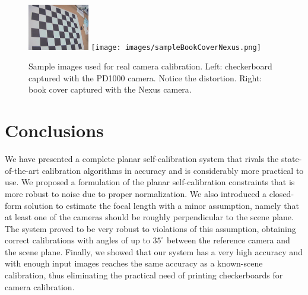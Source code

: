 \documentclass[10pt,twocolumn,letterpaper]{article}
\begin{document}
\begin{figure}
\centering
\includegraphics[height=2cm]{images/sampleOldCam.jpg}
\texttt{[image: images/sampleBookCoverNexus.png]}
\caption{Sample images used for real camera calibration. Left: checkerboard captured with the PD1000 camera. Notice the distortion. Right: book cover captured with the Nexus camera.}
\end{figure}  

\section{Conclusions}

We have presented a complete planar self-calibration system that rivals the state-of-the-art calibration algorithms in accuracy and is considerably more practical to use. We proposed a formulation of the planar self-calibration constraints that is more robust to noise due to proper normalization. We also introduced a closed-form solution to estimate the focal length with a minor assumption, namely that at least one of the cameras should be roughly perpendicular to the scene plane. The system proved to be very robust to violations of this assumption, obtaining correct calibrations with angles of up to $35^\circ$ between the reference camera and the scene plane. Finally, we showed that our system has a very high accuracy and with enough input images reaches the same accuracy as a known-scene calibration, thus eliminating the practical need of printing checkerboards for camera calibration.

{\small


}
\end{document}
